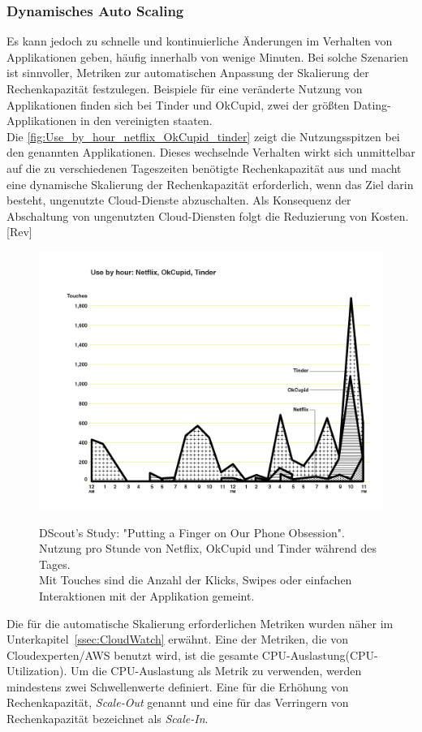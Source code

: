 \subsubsection{Dynamisches Auto Scaling}
Es kann jedoch zu schnelle und kontinuierliche Änderungen im Verhalten von Applikationen geben, häufig innerhalb von wenige Minuten. Bei solche Szenarien ist sinnvoller, Metriken zur automatischen Anpassung der Skalierung der Rechenkapazität festzulegen. Beispiele für eine veränderte Nutzung von Applikationen finden sich bei Tinder und OkCupid, zwei der größten Dating-Applikationen in den vereinigten staaten. \\
Die \autoref{fig:Use_by_hour_netflix_OkCupid_tinder} zeigt die Nutzungsspitzen bei den genannten Applikationen. Dieses wechselnde Verhalten wirkt sich unmittelbar auf die zu verschiedenen Tageszeiten benötigte Rechenkapazität aus und macht eine dynamische Skalierung der Rechenkapazität erforderlich, wenn das Ziel darin besteht, ungenutzte Cloud-Dienste abzuschalten. Als Konsequenz der Abschaltung von ungenutzten Cloud-Diensten folgt die Reduzierung von Kosten.[Rev]
\begin{figure}[h!]
  \centering
  \includegraphics[scale=0.4]{sources/Use_by_hour_netflix_OkCupid_tinder}
  \caption[Nutzung von Tinder, OkCupid und Netflix pro Stunde]{}\label{fig:Use_by_hour_netflix_OkCupid_tinder} 
  DScout's Study: "Putting a Finger on Our Phone Obsession". \\
  Nutzung pro Stunde von Netflix, OkCupid und Tinder während des Tages\cite{SCOUT1}.
  \\Mit Touches sind die Anzahl der Klicks, Swipes oder einfachen Interaktionen mit der Applikation gemeint.
\end{figure}
Die für die automatische Skalierung erforderlichen Metriken wurden näher im Unterkapitel~\ref{ssec:CloudWatch} erwähnt. Eine der Metriken, die von Cloudexperten/AWS %
benutzt wird, ist die gesamte CPU-Auslastung(CPU-Utilization). 
Um die CPU-Auslastung als Metrik zu verwenden, werden mindestens zwei Schwellenwerte definiert. Eine für die Erhöhung von Rechenkapazität, \textit{Scale-Out} genannt und eine für das Verringern von Rechenkapazität bezeichnet als \textit{Scale-In}.


